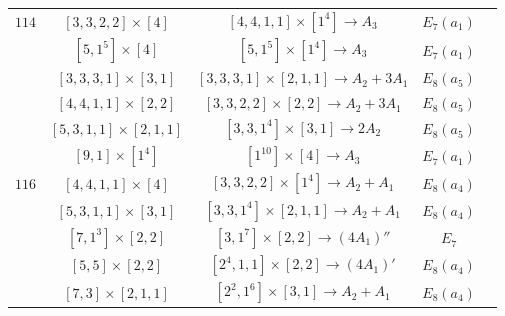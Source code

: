 \documentclass[reqno,12pt]{amsart}
\numberwithin{equation}{section}
\theoremstyle{plain}
\theoremstyle{definition}
\begin{document}
\begin{table}[htbp]
\begin{tabular}{|c|c|c|c|c|}
$ 114$  
&  $ [3,3,2,2]\times [4] $ & { $[4,4,1,1]\times [1^4]\rightarrow     A_3$ } &   $E_7(a_1)$        \\

&{  $ [5,1^5]\times [4] $}& $[5,1^5]\times [1^4]\rightarrow      A_3$ &   $E_7(a_1)$        \\
&  $ [3,3,3,1]\times [3,1] $ & $[3,3,3,1]\times [2,1,1]\rightarrow      A_2+3A_1$   &   $E_8(a_5)$        \\

&  {$ [4,4,1,1]\times [2,2] $ }& $[3,3,2,2]\times [2,2]\rightarrow      A_2+3A_1$  &   $E_8(a_5)$        \\
&{ $ [5,3,1,1]\times [2,1,1] $ }& $[3,3,1^4]\times [3,1]\rightarrow      2A_2$  &   $E_8(a_5)$        \\
&  $ [9,1]\times [1^4] $ & $[1^{10}]\times [4]\rightarrow      A_3$  &   $E_7(a_1)$        \\
\hline

$ 116$  
&  {$ [4,4,1,1]\times [4] $ }& $[3,3,2,2]\times [1^4]\rightarrow      A_2+A_1$  &   $E_8(a_4)$        \\
&{ $ [5,3,1,1]\times [3,1] $ }& $[3,3,1^4]\times [2,1,1]\rightarrow      A_2+A_1$  &   $E_8(a_4)$        \\
&  $ [7,1^3]\times [2,2] $  & $[3,1^{7}]\times [2,2]\rightarrow      (4A_1)''$   &   $E_7$        \\
&  $ [5,5]\times [2,2] $  & $[2^{4},1,1]\times [2,2]\rightarrow      (4A_1)'$  &   $E_8(a_4)$        \\


&  $ [7,3]\times [2,1,1] $ & $[2^{2},1^6]\times [3,1]\rightarrow      A_2+A_1$  &   $E_8(a_4)$        \\
\hline

  
\end{tabular}
	\bigskip
	
\end{table}
\end{document}
